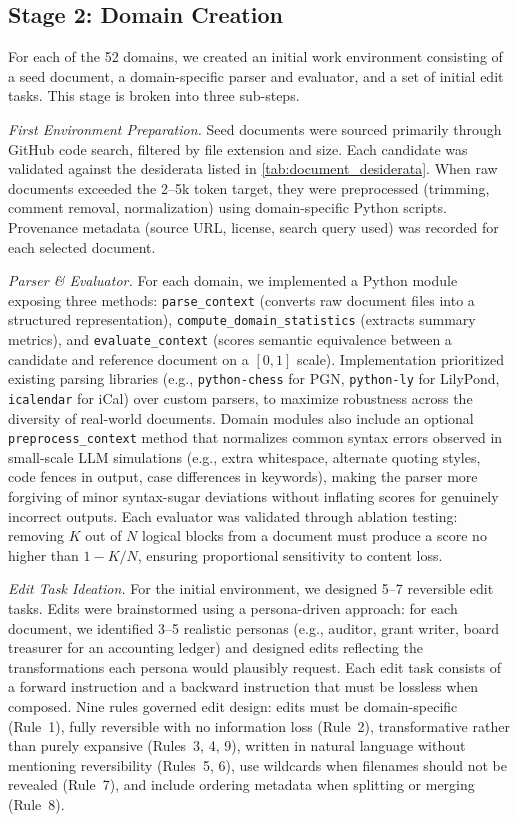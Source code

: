 \documentclass{article} %
\begin{document}
\subsection{Stage 2: Domain Creation} \label{app:domain_creation}
For each of the 52 domains, we created an initial work environment consisting of a seed document, a domain-specific parser and evaluator, and a set of initial edit tasks. This stage is broken into three sub-steps.

\textit{First Environment Preparation.} Seed documents were sourced primarily through GitHub code search, filtered by file extension and size. Each candidate was validated against the desiderata listed in \autoref{tab:document_desiderata}. When raw documents exceeded the 2--5k token target, they were preprocessed (trimming, comment removal, normalization) using domain-specific Python scripts. Provenance metadata (source URL, license, search query used) was recorded for each selected document.

\textit{Parser \& Evaluator.} For each domain, we implemented a Python module exposing three methods: \texttt{parse\_context} (converts raw document files into a structured representation), \texttt{compute\_domain\_statistics} (extracts summary metrics), and \texttt{evaluate\_context} (scores semantic equivalence between a candidate and reference document on a $[0, 1]$ scale). Implementation prioritized existing parsing libraries (e.g., \texttt{python-chess} for PGN, \texttt{python-ly} for LilyPond, \texttt{icalendar} for iCal) over custom parsers, to maximize robustness across the diversity of real-world documents. Domain modules also include an optional \texttt{preprocess\_context} method that normalizes common syntax errors observed in small-scale LLM simulations (e.g., extra whitespace, alternate quoting styles, code fences in output, case differences in keywords), making the parser more forgiving of minor syntax-sugar deviations without inflating scores for genuinely incorrect outputs. Each evaluator was validated through ablation testing: removing $K$ out of $N$ logical blocks from a document must produce a score no higher than $1 - K/N$, ensuring proportional sensitivity to content loss.

\textit{Edit Task Ideation.} For the initial environment, we designed 5--7 reversible edit tasks. Edits were brainstormed using a persona-driven approach: for each document, we identified 3--5 realistic personas (e.g., auditor, grant writer, board treasurer for an accounting ledger) and designed edits reflecting the transformations each persona would plausibly request. Each edit task consists of a forward instruction and a backward instruction that must be lossless when composed. Nine rules governed edit design: edits must be domain-specific (Rule~1), fully reversible with no information loss (Rule~2), transformative rather than purely expansive (Rules~3, 4, 9), written in natural language without mentioning reversibility (Rules~5, 6), use wildcards when filenames should not be revealed (Rule~7), and include ordering metadata when splitting or merging (Rule~8). 
\end{document}
